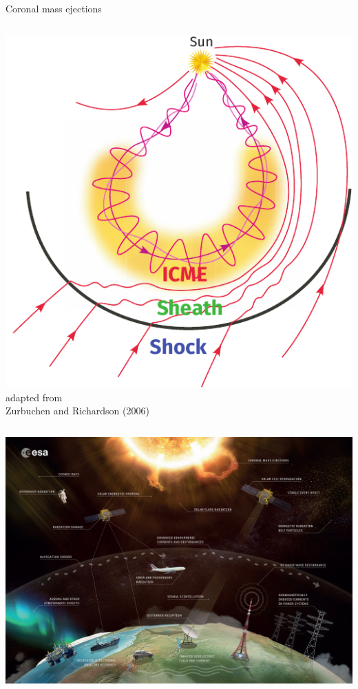\documentclass[10pt,aspectratio=169,usenames,dvipsnames]{beamer}
\begin{document}
\begin{frame}{Coronal mass ejections}
\begin{columns}
\begin{column}{0.36\textwidth}
            \includegraphics[width=\textwidth]{images/ZurbuchenRichardson-adapted.pdf}\\
            \scriptsize adapted from\\Zurbuchen and Richardson (2006)
        \end{column}
    \end{columns}
\end{frame}

\begin{frame}[standout]          
    \includegraphics[height=\paperheight]{images/Space_weather_effects.jpg}
\end{frame}
\end{document}
